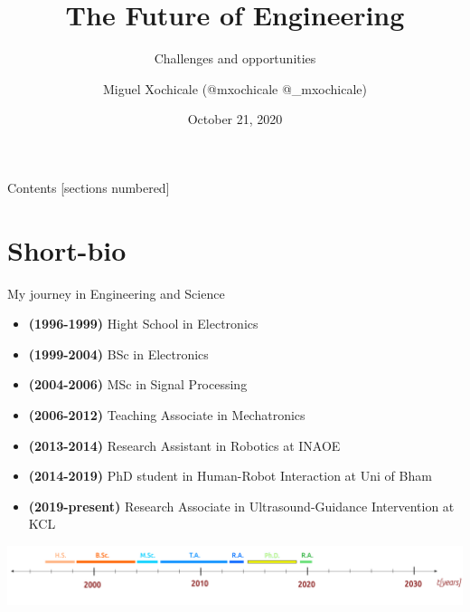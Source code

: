 \documentclass[xcolor={dvipsnames},aspectratio=169,10pt]{beamer}
\title{The Future of Engineering}
\subtitle{Challenges and opportunities }
\author{Miguel Xochicale  (\faGithub @mxochicale  \faTwitter @\_mxochicale) 
}
\date{October 21, 2020}
\begin{document}
\maketitle%

\begin{frame}{Contents}
  [sections numbered]
  \tableofcontents[hideallsubsections]
\end{frame}


\section{Short-bio}

\begin{frame}{My journey in Engineering and Science}

\begin{itemize}	
	\item \textbf{(1996-1999)} Hight School in Electronics
	\item \textbf{(1999-2004)} BSc in Electronics  
	\item \textbf{(2004-2006)} MSc in Signal Processing 
	\item \textbf{(2006-2012)} Teaching Associate in Mechatronics 
	\item \textbf{(2013-2014)} Research Assistant in Robotics at INAOE  
	\item \textbf{(2014-2019)} PhD student in Human-Robot Interaction at Uni of Bham \\
	\item \textbf{(2019-present)} Research Associate in Ultrasound-Guidance 
	Intervention at KCL 
\end{itemize}

	\vspace{4mm}
        \includegraphics[width=\linewidth]{./figs/myjourney/versions/drawing.png}

\end{frame}
\end{document}
